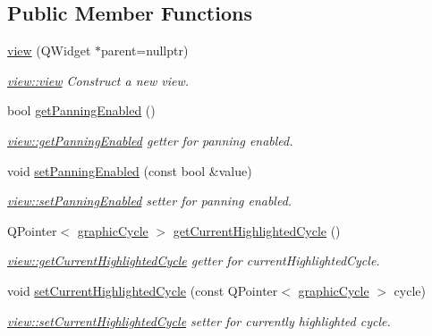 \subsection*{Public Member Functions}
\begin{DoxyCompactItemize}
\item 
\mbox{\hyperlink{classview_a5b500c7ca4c4631a614445bcf8c06ed8}{view}} (Q\+Widget $\ast$parent=nullptr)
\begin{DoxyCompactList}\small\item\em \mbox{\hyperlink{classview_a5b500c7ca4c4631a614445bcf8c06ed8}{view\+::view}} Construct a new view. \end{DoxyCompactList}\item 
bool \mbox{\hyperlink{classview_aea81f104e17ad13b12d66dabc82b2df0}{get\+Panning\+Enabled}} ()
\begin{DoxyCompactList}\small\item\em \mbox{\hyperlink{classview_aea81f104e17ad13b12d66dabc82b2df0}{view\+::get\+Panning\+Enabled}} getter for panning enabled. \end{DoxyCompactList}\item 
void \mbox{\hyperlink{classview_a78e6621aad0346c49fc9d9e0e4f268f5}{set\+Panning\+Enabled}} (const bool \&value)
\begin{DoxyCompactList}\small\item\em \mbox{\hyperlink{classview_a78e6621aad0346c49fc9d9e0e4f268f5}{view\+::set\+Panning\+Enabled}} setter for panning enabled. \end{DoxyCompactList}\item 
Q\+Pointer$<$ \mbox{\hyperlink{classgraphic_cycle}{graphic\+Cycle}} $>$ \mbox{\hyperlink{classview_aa0b6bfa057ab5c4d8f3bd60557622533}{get\+Current\+Highlighted\+Cycle}} ()
\begin{DoxyCompactList}\small\item\em \mbox{\hyperlink{classview_aa0b6bfa057ab5c4d8f3bd60557622533}{view\+::get\+Current\+Highlighted\+Cycle}} getter for current\+Highlighted\+Cycle. \end{DoxyCompactList}\item 
void \mbox{\hyperlink{classview_a69ba93a57967891ba91517b9fd50e369}{set\+Current\+Highlighted\+Cycle}} (const Q\+Pointer$<$ \mbox{\hyperlink{classgraphic_cycle}{graphic\+Cycle}} $>$ cycle)
\begin{DoxyCompactList}\small\item\em \mbox{\hyperlink{classview_a69ba93a57967891ba91517b9fd50e369}{view\+::set\+Current\+Highlighted\+Cycle}} setter for currently highlighted cycle. \end{DoxyCompactList}\item 

\end{DoxyCompactItemize}
